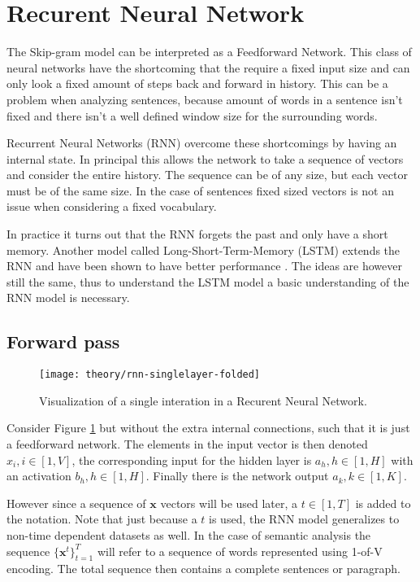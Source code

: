 
\section{Recurent Neural Network}

The Skip-gram model can be interpreted as a Feedforward Network. This class of neural networks have the shortcoming that the require a fixed input size and can only look a fixed amount of steps back and forward in history. This can be a problem when analyzing sentences, because amount of words in a sentence isn't fixed and there isn't a well defined window size for the surrounding words.

Recurrent Neural Networks (RNN) overcome these shortcomings by having an internal state. In principal this allows the network to take a sequence of vectors and consider the entire history. The sequence can be of any size, but each vector must be of the same size. In the case of sentences fixed sized vectors is not an issue when considering a fixed vocabulary.

In practice it turns out that the RNN forgets the past and only have a short memory. Another model called Long-Short-Term-Memory (LSTM) extends the RNN and have been shown to have better performance \cite{missing source}. The ideas are however still the same, thus to understand the LSTM model a basic understanding of the RNN model is necessary.

\subsection{Forward pass}

\begin{figure}[h]
	\centering
	\texttt{[image: theory/rnn-singlelayer-folded]}
	\caption{Visualization of a single interation in a Recurent Neural Network.}
	\label{fig:theory:rnn:rnn-singlelayer-folded}
\end{figure}

Consider Figure \ref{fig:theory:rnn:rnn-singlelayer-folded} but without the extra internal connections, such that it is just a feedforward network. The elements in the input vector is then denoted $x_{i}, i \in [1, V]$, the corresponding input for the hidden layer is $a_{h}, h \in [1, H]$ with an activation $b_{h}, h \in [1, H]$. Finally there is the network output $a_{k}, k \in [1, K]$.

However since a sequence of $\mathbf{x}$ vectors will be used later, a $t \in [1, T]$ is added to the notation. Note that just because a $t$ is used, the RNN model generalizes to non-time dependent datasets as well. In the case of semantic analysis the sequence $\{\mathbf{x}^t\}_{t=1}^T$ will refer to a sequence of words represented using 1-of-V encoding. The total sequence then contains a complete sentences or paragraph. 

